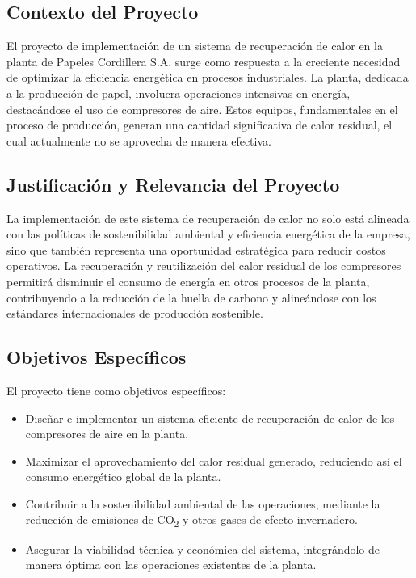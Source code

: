 \documentclass[11pt,a4paper]{article}  %
\begin{document}
\subsection{Contexto del Proyecto}
El proyecto de implementación de un sistema de recuperación de calor en la planta de Papeles Cordillera S.A. surge como respuesta a la creciente necesidad de optimizar la eficiencia energética en procesos industriales. La planta, dedicada a la producción de papel, involucra operaciones intensivas en energía, destacándose el uso de compresores de aire. Estos equipos, fundamentales en el proceso de producción, generan una cantidad significativa de calor residual, el cual actualmente no se aprovecha de manera efectiva.

\subsection{Justificación y Relevancia del Proyecto}
La implementación de este sistema de recuperación de calor no solo está alineada con las políticas de sostenibilidad ambiental y eficiencia energética de la empresa, sino que también representa una oportunidad estratégica para reducir costos operativos. La recuperación y reutilización del calor residual de los compresores permitirá disminuir el consumo de energía en otros procesos de la planta, contribuyendo a la reducción de la huella de carbono y alineándose con los estándares internacionales de producción sostenible.

\subsection{Objetivos Específicos}
El proyecto tiene como objetivos específicos:
\begin{itemize}
    \item Diseñar e implementar un sistema eficiente de recuperación de calor de los compresores de aire en la planta.
    \item Maximizar el aprovechamiento del calor residual generado, reduciendo así el consumo energético global de la planta.
    \item Contribuir a la sostenibilidad ambiental de las operaciones, mediante la reducción de emisiones de CO\textsubscript{2} y otros gases de efecto invernadero.
    \item Asegurar la viabilidad técnica y económica del sistema, integrándolo de manera óptima con las operaciones existentes de la planta.
\end{itemize}
\end{document}
